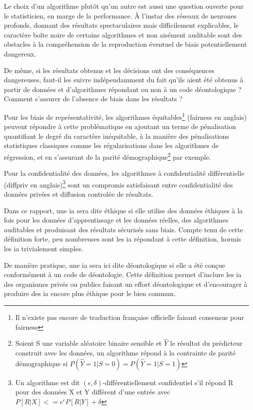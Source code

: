 Le choix d'un algorithme plutôt qu'un autre est aussi une question ouverte pour le statisticien, en marge de la performance. À l'instar des réseaux de neurones profonds, donnant des résultats spectaculaires mais difficilement explicables, le caractère boîte noire de certains algorithmes et non aisément auditable sont des obstacles à la compréhension de la reproduction éventuel de biais potentiellement dangereux.

De même, si les résultats obtenus et les décisions ont des conséquences dangereuses, faut-il les suivre indépendamment du fait qu'ils aient été obtenus à partir de données et d'algorithmes répondant ou non à un code déontologique ? Comment s'assurer de l'absence de biais dans les résultats ?

Pour les biais de représentativité, les algorithmes équitables\footnote{Il n'existe pas encore de traduction française officielle faisant consensus pour \gls{fairness}} (\gls{fairness} en anglais) peuvent répondre à cette problématique en ajoutant un terme de pénalisation quantifiant le degré du caractère inéquitable, à la manière des pénalisations statistiques classiques comme les régularisations dans les algorithmes de régression, et en s'assurant de la parité démographique\footnote{Soient S une variable aléatoire binaire sensible et $\hat{Y}$ le résultat du prédicteur construit avec les données, un algorithme répond à la contrainte de parité démographique si $P(\hat{Y}=1|S=0)=P(\hat{Y}=1|S=1)$} par exemple. 

Pour la confidentialité des données, les algorithmes à confidentialité différentielle (\gls{diffpriv} en anglais)\footnote{Un algorithme est dit $ (\epsilon,\delta)$-différentiellement confidentiel s'il répond R pour des données X et Y différent d'une entrée avec $P[R|X]<=e^\epsilon P[R|Y] + \delta$}  sont un compromis satisfaisant entre confidentialité des données privées et diffusion controlée de résultats.

Dans ce rapport, une \gls{ia} sera dite éthique si elle utilise des données éthiques à la fois pour les données d'apprentissage et les données réelles, des algorithmes auditables et produisant des résultats sécurisés sans biais. Compte tenu de cette définition forte, peu nombreuses sont les \gls{ia} répondant à cette définition, hormis les \gls{ia} trivialement simples.

De manière pratique, une \gls{ia} sera ici dite déontologique si elle a été conçue conformément à un code de déontologie. Cette définition permet d'inclure les \gls{ia} des organismes privés ou publics faisant un effort déontologique et d'encourager à produire des \gls{ia} encore plus éthique pour le bien commun.


